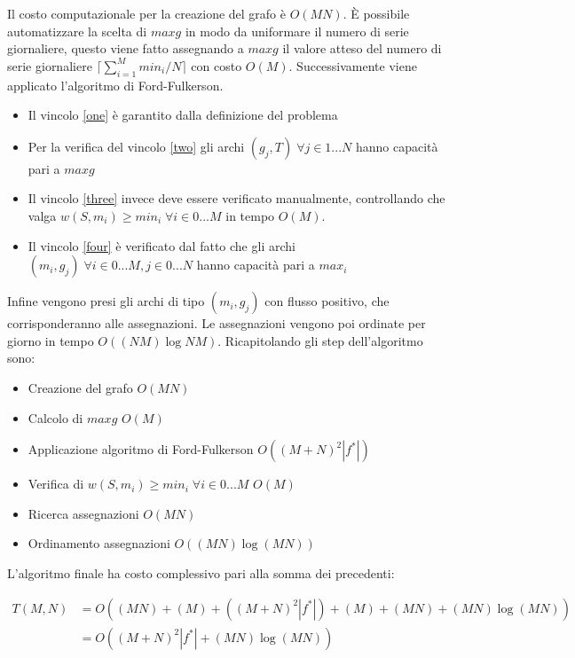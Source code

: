 \documentclass{article}
\begin{document}
Il costo computazionale per la creazione del grafo è $O(MN)$.
È possibile automatizzare la scelta di $maxg$ in modo da uniformare il numero di
serie giornaliere, questo viene fatto assegnando a $maxg$ il valore atteso del
numero di serie giornaliere $\lceil \sum_{i=1}^Mmin_i / N \rceil$ con costo
$O(M)$.
Successivamente viene applicato l'algoritmo di Ford-Fulkerson.
\begin{itemize}
    \item Il vincolo \ref{one} è garantito dalla definizione del problema
    \item Per la verifica del vincolo \ref{two} gli archi
    $(g_j, T) \; \forall j \in 1...N$ hanno capacità pari a $maxg$
    \item Il vincolo \ref{three} invece deve essere verificato manualmente,
    controllando che valga $w(S, m_i) \geq min_i \; \forall i \in 0...M$ in
    tempo $O(M)$.
    \item Il vincolo \ref{four} è verificato dal fatto che gli archi
    $(m_i, g_j) \; \forall i \in 0...M, j \in 0...N$ hanno capacità pari a
    $max_i$
\end{itemize}
Infine vengono presi gli archi di tipo $(m_i, g_j)$ con flusso positivo, che
corrisponderanno alle assegnazioni. Le assegnazioni vengono poi ordinate per
giorno in tempo $O((NM) \log NM)$.
Ricapitolando gli step dell'algoritmo sono:
\begin{itemize}
    \item Creazione del grafo $O(MN)$
    \item Calcolo di $maxg$ $O(M)$
    \item Applicazione algoritmo di Ford-Fulkerson $O((M + N)^2 |f^*|)$
    \item Verifica di $w(S, m_i) \geq min_i \; \forall i \in 0...M$ $O(M)$
    \item Ricerca assegnazioni $O(MN)$
    \item Ordinamento assegnazioni $O((MN) \log (MN))$
\end{itemize}
L'algoritmo finale ha costo complessivo pari alla somma dei precedenti:

\begin{equation*}
\begin{split}
    T(M, N) &= O((MN) + (M) + ((M+N)^2 |f^*|) + (M) + (MN) + (MN) \log (MN)) \\
            &= \boxed{O((M+N)^2 |f^*| + (MN) \log (MN))} \\
\end{split}
\end{equation*}
\end{document}
